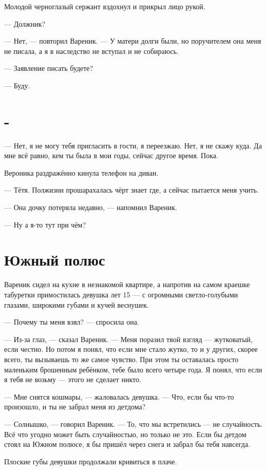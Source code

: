 \documentclass[a4paper,10pt,fleqn]{book}\usepackage{polyglossia}\setdefaultlanguage{english}\setotherlanguage{russian}\defaultfontfeatures{Ligatures=TeX,Mapping=tex-text} \usepackage{xcolor}\definecolor{lightgray}{HTML}{bbbbbb}\color{lightgray}\newcommand{\ml}[3]{\textcolor{black}{#3}}
\begin{document}
Молодой черноглазый сержант вздохнул и прикрыл лицо рукой.

--- Должник?

--- Нет, --- повторил Вареник.
--- У матери долги были, но поручителем она меня не писала, а я в наследство не вступал и не собираюсь.

--- Заявление писать будете?

--- Буду.

\section{-}

--- Нет, я не могу тебя пригласить в гости, я переезжаю.
Нет, я не скажу куда.
Да мне всё равно, кем ты была в мои годы, сейчас другое время.
Пока.

Вероника раздражённо кинула телефон на диван.

--- Тётя.
Полжизни прошарахалась чёрт знает где, а сейчас пытается меня учить.

--- Она дочку потеряла недавно, --- напомнил Вареник.

--- Ну а я-то тут при чём?

\section{Южный полюс}

Вареник сидел на кухне в незнакомой квартире, а напротив на самом краешке табуретки примостилась девушка лет 15 --- с огромными светло-голубыми глазами, широкими губами и кучей веснушек.

--- Почему ты меня взял? --- спросила она.

--- Из-за глаз, --- сказал Вареник.
--- Меня поразил твой взгляд --- жутковатый, если честно.
Но потом я понял, что если мне стало жутко, то и у других, скорее всего, ты вызываешь то же самое чувство.
При этом ты оставалась просто маленьким брошенным ребёнком, тебе было всего четыре года.
Я понял, что если я тебя не возьму --- этого не сделает никто.

--- Мне снятся кошмары, --- жаловалась девушка.
--- Что, если бы что-то произошло, и ты не забрал меня из детдома?

--- Солнышко, --- говорил Вареник.
--- То, что мы встретились --- не случайность.
Всё что угодно может быть случайностью, но только не это.
Если бы детдом стоял на Южном полюсе, я бы пришёл через снега и забрал бы тебя навсегда.

Плоские губы девушки продолжали кривиться в плаче.
\end{document}
